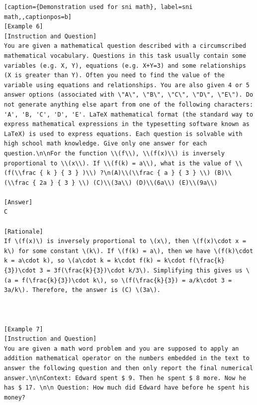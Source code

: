 \begin{lstlisting}[caption={Demonstration used for sni math}, label=sni math,,captionpos=b]
[Example 6]
[Instruction and Question]
You are given a mathematical question described with a circumscribed mathematical vocabulary. Questions in this task usually contain some variables (e.g. X, Y), equations (e.g. X+Y=3) and some relationships (X is greater than Y). Often you need to find the value of the variable using equations and relationships. You are also given 4 or 5 answer options (associated with \"A\", \"B\", \"C\", \"D\", \"E\"). Do not generate anything else apart from one of the following characters: 'A', 'B, 'C', 'D', 'E'. LaTeX mathematical format (the standard way to express mathematical expressions in the typesetting software known as LaTeX) is used to express equations. Each question is solvable with high school math knowledge. Give only one answer for each question.\n\nFor the function \\(f\\), \\(f(x)\\) is inversely proportional to \\(x\\). If \\(f(k) = a\\), what is the value of \\(f(\\frac { k } { 3 } )\\) ?\n(A)\\(\\frac { a } { 3 } \\) (B)\\(\\frac { 2a } { 3 } \\) (C)\\(3a\\) (D)\\(6a\\) (E)\\(9a\\)

[Answer]
C

[Rationale]
If \(f(x)\) is inversely proportional to \(x\), then \(f(x)\cdot x = k\) for some constant \(k\). If \(f(k) = a\), then we have \(f(k)\cdot k = a\cdot k), so \(a\cdot k = k\cdot f(k) = k\cdot f(\frac{k}{3})\cdot 3 = 3f(\frac{k}{3})\cdot k/3\). Simplifying this gives us \(a = f(\frac{k}{3})\cdot k\), so \(f(\frac{k}{3}) = a/k\cdot 3 = 3a/k\). Therefore, the answer is (C) \(3a\).



[Example 7]
[Instruction and Question]
You are given a math word problem and you are supposed to apply an addition mathematical operator on the numbers embedded in the text to answer the following question and then only report the final numerical answer.\n\nContext: Edward spent $ 9. Then he spent $ 8 more. Now he has $ 17. \n\n Question: How much did Edward have before he spent his money?


\end{lstlisting}
